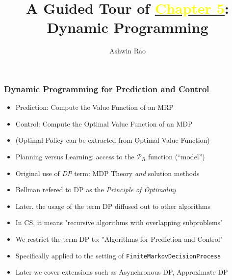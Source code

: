 \documentclass[handout]{beamer}
\title[Dynamic Programming Chapter]{A Guided Tour of \href{http://stanford.edu/~ashlearn/RLForFinanceBook/book.pdf}{\underline{\textcolor{yellow}{Chapter 5}}}: \\  Dynamic Programming} %
\author{Ashwin Rao} %
\institute[Stanford] %
{ICME, Stanford University
}
\date %
\begin{document}
\lstset{language=Python}  
\begin{frame}
\titlepage %
\end{frame}


\begin{frame}
\frametitle{Dynamic Programming for Prediction and Control}
\pause
\begin{itemize}[<+->]
\item Prediction: Compute the Value Function of an MRP
\item Control: Compute the Optimal Value Function of an MDP
\item (Optimal Policy can be extracted from Optimal Value Function)
\item Planning versus Learning: access to the $\mathcal{P}_R$ function (``model'')
\item Original use of {\em DP} term: MDP Theory {\em and} solution methods
\item Bellman refered to DP as the {\em Principle of Optimality}
\item Later, the usage of the term DP diffused out to other algorithms
\item In CS, it means "recursive algorithms with overlapping subproblems"
\item We restrict the term DP to: "Algorithms for Prediction and Control"
\item Specifically applied to the setting of \lstinline{FiniteMarkovDecisionProcess}
\item Later we cover extensions such as Asynchronous DP, Approximate DP
\end{itemize}
\end{frame}
\end{document}

